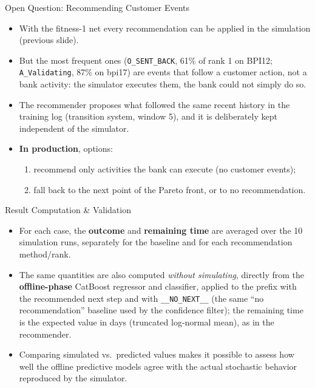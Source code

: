 \documentclass[aspectratio=169]{beamer} %
\begin{document}
\begin{frame}{Open Question: Recommending Customer Events}
  \small
  \begin{itemize}
    \item With the fitness-1 net every recommendation can be applied in the simulation (previous slide).
    \item But the most frequent ones (\texttt{O\_SENT\_BACK}, 61\% of rank 1 on BPI12; \texttt{A\_Validating},
      87\% on bpi17) are events that follow a \alert{customer} action, not a bank activity: the simulator
      executes them, the bank could not simply do so.
    \item The recommender proposes what followed the same recent history in the training log (transition
      system, window 5), and it is deliberately kept independent of the simulator.
    \item \textbf{In production}, options:
      \begin{enumerate}
        \item recommend only activities the bank can execute (no customer events);
        \item fall back to the next point of the Pareto front, or to no recommendation.
      \end{enumerate}
  \end{itemize}
\end{frame}

\begin{frame}{Result Computation \& Validation}
    \begin{itemize}
        \item For each case, the \textbf{outcome} and \textbf{remaining time} are averaged over the 10 simulation runs, separately for the baseline and for each recommendation method/rank.
        \item The same quantities are also computed \textit{without simulating}, directly from the \textbf{offline-phase} CatBoost regressor and classifier, applied to the prefix with the recommended next step and with \texttt{\_\_NO\_NEXT\_\_} (the same ``no recommendation'' baseline used by the confidence filter); the remaining time is the expected value in days (truncated log-normal mean), as in the recommender.
        \item Comparing simulated vs.\ predicted values makes it possible to assess how well the offline predictive models agree with the actual stochastic behavior reproduced by the simulator.
    \end{itemize}
\end{frame}
\end{document}
